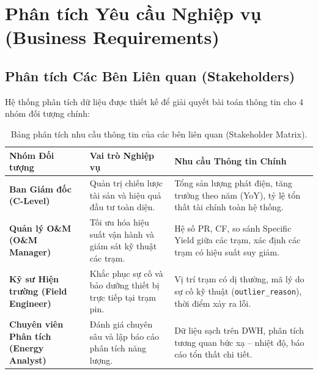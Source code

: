 \section{Phân tích Yêu cầu Nghiệp vụ (Business Requirements)}
\label{sec:yeucau_nghiepvu}

\subsection{Phân tích Các Bên Liên quan (Stakeholders)}
Hệ thống phân tích dữ liệu được thiết kế để giải quyết bài toán thông tin cho 4 nhóm đối tượng chính:

\begin{table}[H]
\centering
\small
\renewcommand{\arraystretch}{1.25}
\begin{tabularx}{\textwidth}{@{} l p{4.5cm} X @{}}
\toprule
\textbf{Nhóm Đối tượng} & \textbf{Vai trò Nghiệp vụ} & \textbf{Nhu cầu Thông tin Chính} \\
\midrule
\textbf{Ban Giám đốc (C-Level)} & 
Quản trị chiến lược tài sản và hiệu quả đầu tư toàn diện. & 
Tổng sản lượng phát điện, tăng trưởng theo năm (YoY), tỷ lệ tổn thất tài chính toàn hệ thống. \\
\midrule
\textbf{Quản lý O\&M (O\&M Manager)} & 
Tối ưu hóa hiệu suất vận hành và giám sát kỹ thuật các trạm. & 
Hệ số PR, CF, so sánh Specific Yield giữa các trạm, xác định các trạm có hiệu suất suy giảm. \\
\midrule
\textbf{Kỹ sư Hiện trường (Field Engineer)} & 
Khắc phục sự cố và bảo dưỡng thiết bị trực tiếp tại trạm pin. & 
Vị trí trạm có dị thường, mã lý do sự cố kỹ thuật (\texttt{outlier\_reason}), thời điểm xảy ra lỗi. \\
\midrule
\textbf{Chuyên viên Phân tích (Energy Analyst)} & 
Đánh giá chuyên sâu và lập báo cáo phân tích năng lượng. & 
Dữ liệu sạch trên DWH, phân tích tương quan bức xạ -- nhiệt độ, báo cáo tổn thất chi tiết. \\
\bottomrule
\end{tabularx}
\caption{Bảng phân tích nhu cầu thông tin của các bên liên quan (Stakeholder Matrix).}
\label{tab:stakeholder_matrix}
\end{table}

